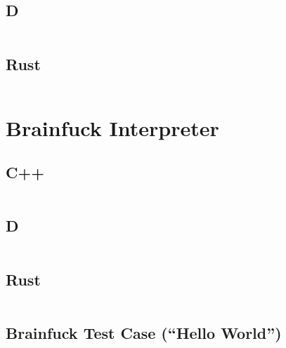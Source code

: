 \documentclass[finalcopy]{srpaper}
\begin{document}
\subsection{D}
\begin{mdframed}[linecolor=black]
\inputminted[fontsize=\scriptsize]{d}{../examples/parallel-merge-sort/parallel_merge_sort.d}
\end{mdframed}

\subsection{Rust}
\begin{mdframed}[linecolor=black]
\inputminted[fontsize=\scriptsize]{rust}{../examples/parallel-merge-sort/parallel_merge_sort.rs}
\end{mdframed}

\section{Brainfuck Interpreter}

\subsection{C++}
\begin{mdframed}[linecolor=black]
\inputminted[fontsize=\scriptsize]{cpp}{../examples/brainfsck/brainfsck.cpp}
\end{mdframed}

\subsection{D}
\begin{mdframed}[linecolor=black]
\inputminted[fontsize=\scriptsize]{d}{../examples/brainfsck/brainfsck.d}
\end{mdframed}

\subsection{Rust}
\begin{mdframed}[linecolor=black]
\inputminted[fontsize=\scriptsize]{rust}{../examples/brainfsck/brainfsck.rs}
\end{mdframed}

\subsection{Brainfuck Test Case (``Hello World'')}
\begin{mdframed}[linecolor=black]
\inputminted[fontsize=\scriptsize]{brainfuck}{../examples/brainfsck/tests/hello.bf}
\end{mdframed}
\end{document}
